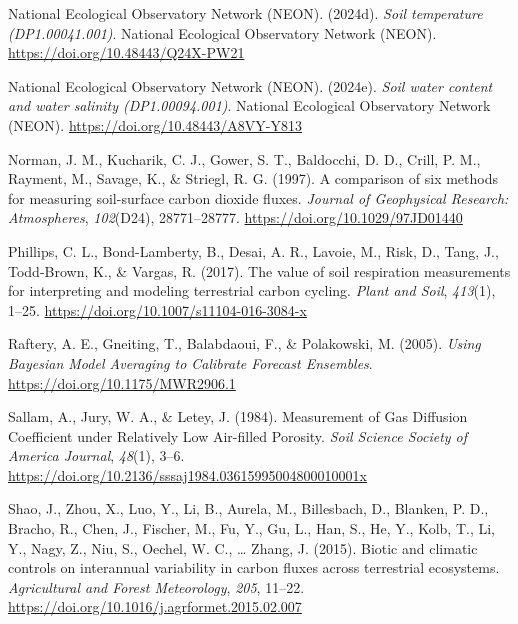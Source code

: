 \documentclass[
  letterpaper,
  DIV=11,
  numbers=noendperiod]{scrartcl}
\newlength{\cslhangindent}
\newenvironment{CSLReferences}[2] %
 {\begin{list}{}{%
  \setlength{\itemindent}{0pt}
  \setlength{\leftmargin}{0pt}
  \setlength{\parsep}{0pt}
  \ifodd #1
   \setlength{\leftmargin}{\cslhangindent}
   \setlength{\itemindent}{-1\cslhangindent}
  \fi
  \setlength{\itemsep}{#2\baselineskip}}}
 {\end{list}}
\begin{document}
\begin{CSLReferences}{1}{0}
National Ecological Observatory Network (NEON). (2024d). \emph{Soil
temperature ({DP1}.00041.001)}. National Ecological Observatory Network
(NEON). \url{https://doi.org/10.48443/Q24X-PW21}

National Ecological Observatory Network (NEON). (2024e). \emph{Soil
water content and water salinity ({DP1}.00094.001)}. National Ecological
Observatory Network (NEON). \url{https://doi.org/10.48443/A8VY-Y813}

Norman, J. M., Kucharik, C. J., Gower, S. T., Baldocchi, D. D., Crill,
P. M., Rayment, M., Savage, K., \& Striegl, R. G. (1997). A comparison
of six methods for measuring soil-surface carbon dioxide fluxes.
\emph{Journal of Geophysical Research: Atmospheres}, \emph{102}(D24),
28771--28777. \url{https://doi.org/10.1029/97JD01440}

Phillips, C. L., Bond-Lamberty, B., Desai, A. R., Lavoie, M., Risk, D.,
Tang, J., Todd-Brown, K., \& Vargas, R. (2017). The value of soil
respiration measurements for interpreting and modeling terrestrial
carbon cycling. \emph{Plant and Soil}, \emph{413}(1), 1--25.
\url{https://doi.org/10.1007/s11104-016-3084-x}

Raftery, A. E., Gneiting, T., Balabdaoui, F., \& Polakowski, M. (2005).
\emph{Using {Bayesian Model Averaging} to {Calibrate Forecast
Ensembles}}. \url{https://doi.org/10.1175/MWR2906.1}

Sallam, A., Jury, W. A., \& Letey, J. (1984). Measurement of {Gas
Diffusion Coefficient} under {Relatively Low Air}-filled {Porosity}.
\emph{Soil Science Society of America Journal}, \emph{48}(1), 3--6.
\url{https://doi.org/10.2136/sssaj1984.03615995004800010001x}

Shao, J., Zhou, X., Luo, Y., Li, B., Aurela, M., Billesbach, D.,
Blanken, P. D., Bracho, R., Chen, J., Fischer, M., Fu, Y., Gu, L., Han,
S., He, Y., Kolb, T., Li, Y., Nagy, Z., Niu, S., Oechel, W. C., \ldots{}
Zhang, J. (2015). Biotic and climatic controls on interannual
variability in carbon fluxes across terrestrial ecosystems.
\emph{Agricultural and Forest Meteorology}, \emph{205}, 11--22.
\url{https://doi.org/10.1016/j.agrformet.2015.02.007}


\end{CSLReferences}
\end{document}
